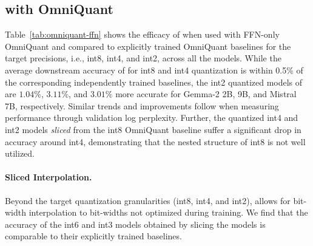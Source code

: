 \vspace*{-2mm}
\subsection{\alg with OmniQuant}
\label{sec:exp-omniquant}
Table~\ref{tab:omniquant-ffn} shows the efficacy of \alg when used with FFN-only OmniQuant and compared to explicitly trained OmniQuant baselines for the target precisions, i.e., int8, int4, and int2, across all the models. While the average downstream accuracy of \alg for int8 and int4 quantization is within 0.5\% of the corresponding independently trained baselines, the int2 quantized models of \alg are $1.04\%$, $3.11\%$, and $3.01\%$ more accurate for Gemma-2 2B, 9B, and Mistral 7B, respectively. Similar trends and improvements follow when measuring performance through validation log perplexity. Further, the quantized int4 and int2 models \textit{sliced} from the int8 OmniQuant baseline suffer a significant drop in accuracy around int4, demonstrating that the nested structure of int8 is not well utilized.

\vspace{-2mm}
\paragraph{Sliced Interpolation.}
Beyond the target quantization granularities (int8, int4, and int2), \alg allows for bit-width interpolation to bit-widths not optimized during training. We find that the accuracy of the int6 and int3 models obtained by slicing the \alg models is comparable to their explicitly trained baselines.




